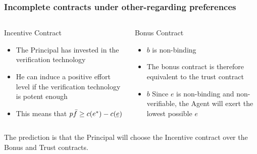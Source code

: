 \documentclass{beamer}
\newcommand{\ubar}[1]{\underaccent{\bar}{#1}}
\begin{document}
\begin{frame}
	\frametitle{Incomplete contracts under other-regarding preferences}

\begin{columns}[T] %
\begin{column}{.48\textwidth}
\begin{center}
Incentive Contract

\begin{itemize}
\item The Principal has invested in the verification technology
\item He can induce a positive effort level if the verification technology is potent enough
\item This means that $p\bar{f} \geq c(e^*) - c(\ubar{e})$
\end{itemize}
\end{center}
\end{column}%
\hfill%
\begin{column}{.48\textwidth}

\begin{center}
Bonus Contract


\begin{itemize}
\item $b$ is non-binding
\item The bonus contract is therefore equivalent to the trust contract
\item $b$ Since $e$ is non-binding and non-verifiable, the Agent will exert the lowest possible $e$

\end{itemize}
\end{center}
\end{column}%
\end{columns}

\hfill

\hfill


The prediction is that the Principal will choose the Incentive contract over the Bonus and Trust contracts.		
		
\end{frame}
\end{document}
